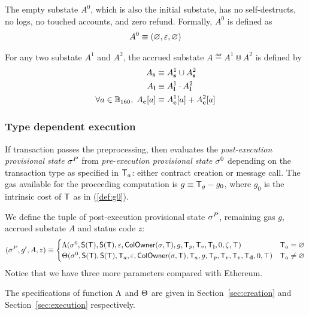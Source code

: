 The empty substate $A^0$, which is also the initial substate, has no self-destructs, no logs, no touched accounts, and zero refund. Formally, $A^0$ is defined as
\begin{align}
	A^0\equiv \left( \varnothing, \mathbb{\varepsilon}, \varnothing\right)
\end{align}

For any two substate $A^1$ and $A^2$, the accrued substate $A\eqdef A^1\Cup A^2$ is defined by 
\begin{align}
	A_{\bf s} &\equiv A^1_{\bf s} \cup A^2_{\bf s} \\ 
	A_{\bf l} &\equiv A^1_{\bf l} \cdot A^2_{\bf l} \\
	\forall a\in\mathbb{B}_{160},\; A_{\bf c}[a] & \equiv A^1_{\bf c}[a]+A^2_{\bf c}[a]
\end{align}


\subsubsection{Type dependent execution}

If transaction passes the preprocessing, 
then {\name} evaluates the \emph{post-execution provisional state} $\mathbf{\sigma}^P$ from \emph{pre-execution provisional state} $\mathbf{\sigma}^0$ depending on the transaction type as specified in $\textsf{T}_a$: either contract creation or message call. 
%
The gas available for the proceeding computation is $g\equiv \textsf{T}_g-g_0$, where $g_0$ is the intrinsic cost of $\textsf{T}$ as in (\ref{def:g0}). 

We define the tuple of post-execution provisional state $\mathbf{\sigma}^{P}$, remaining gas $g$, accrued substate $A$ and status code $z$:
\begin{align}\label{def:transform}
	(\mathbf{\sigma}^{P},g',A,z)\equiv
	\begin{cases}
		\mathrm{\Lambda}(\mathbf{\sigma}^0,\mathsf{S}{\left({\textsf{T}} \right)},\mathsf{S}{\left({\textsf{T}} \right)},\mathbb{\varepsilon}, \mathsf{ColOwner}(\mathbf{\sigma},\textsf{T}),g,\textsf{T}_p,\textsf{T}_v,\textsf{T}_{\bf i},0,\zeta,\top) &  \textsf{T}_a=\varnothing \\
		\mathrm{\Theta}(\mathbf{\sigma}^0,\mathsf{S}{\left({\textsf{T}} \right)},\mathsf{S}{\left({\textsf{T}} \right)},\textsf{T}_a,\mathbb{\varepsilon},\mathsf{ColOwner}(\mathbf{\sigma},\textsf{T}),\textsf{T}_a,g,\textsf{T}_p,\textsf{T}_v,\textsf{T}_v,\textsf{T}_{\bf d},0,\top) & \textsf{T}_a\neq\varnothing
	\end{cases}
\end{align}
%
Notice that we have three more parameters compared with Ethereum. 

The specifications of function $\mathrm{\Lambda}$ and $\mathrm{\Theta}$ are given in Section~\ref{sec:creation} and Section~\ref{sec:execution} respectively.

